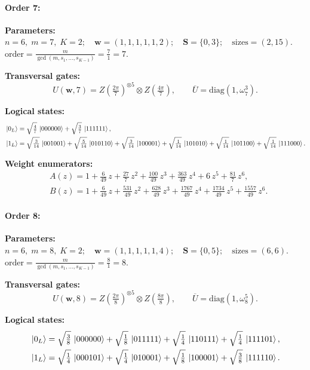 \documentclass[pdflatex,sn-nature]{sn-jnl}%
\theoremstyle{thmstyleone}%
\theoremstyle{thmstyletwo}%
\theoremstyle{thmstylethree}%
\begin{document}
\begin{appendices}
\paragraph{\textbf{Order 7:}}
\noindent\textbf{Parameters:} $n=6,\; m=7,\; K=2;\quad \mathbf w=(1, 1, 1, 1, 1, 2);\quad \mathbf S=\{0, 3\};\quad \text{sizes}=\left(2, 15\right).$ $\displaystyle \text{order}=\frac{m}{\gcd(m,s_1,\dots,s_{K-1})}=\frac{7}{1}=7.$

\noindent\textbf{Transversal gates:}
\[
    U(\mathbf w,7)=Z \left(\tfrac{2\pi}{7}\right)^{\otimes5} \otimes Z \left(\tfrac{4\pi}{7}\right) ,\qquad
    \overline U=\mathrm{diag}(1,\omega_{7}^{3}).
\]

\noindent\textbf{Logical states:}
\begin{align*}
    &\ket{0_L} = \sqrt{\tfrac{4}{7}}\,\ket{000000} + \sqrt{\tfrac{3}{7}}\,\ket{111111}, \\
    &\ket{1_L} = \sqrt{\tfrac{3}{14}}\,\ket{001001} + \sqrt{\tfrac{5}{14}}\,\ket{010110} + \sqrt{\tfrac{3}{14}}\,\ket{100001} + \sqrt{\tfrac{1}{14}}\,\ket{101010} + \sqrt{\tfrac{1}{14}}\,\ket{101100} + \sqrt{\tfrac{1}{14}}\,\ket{111000}.
\end{align*}

\noindent\textbf{Weight enumerators:}
\begin{align*}
    &A(z) = 1 + \tfrac{6}{49}\,z + \tfrac{27}{7}\,z^{2} + \tfrac{100}{49}\,z^{3} + \tfrac{363}{49}\,z^{4} + 6\,z^{5} + \tfrac{81}{7}\,z^{6}, \\
    &B(z) = 1 + \tfrac{6}{49}\,z + \tfrac{531}{49}\,z^{2} + \tfrac{628}{49}\,z^{3} + \tfrac{1767}{49}\,z^{4} + \tfrac{1734}{49}\,z^{5} + \tfrac{1557}{49}\,z^{6}.
\end{align*}

\paragraph{\textbf{Order 8:}}
\noindent\textbf{Parameters:} $n=6,\; m=8,\; K=2;\quad \mathbf w=(1, 1, 1, 1, 1, 4);\quad \mathbf S=\{0, 5\};\quad \text{sizes}=\left(6, 6\right).$ $\displaystyle \text{order}=\frac{m}{\gcd(m,s_1,\dots,s_{K-1})}=\frac{8}{1}=8.$

\noindent\textbf{Transversal gates:}
\[
    U(\mathbf w,8)=Z \left(\tfrac{2\pi}{8}\right)^{\otimes5} \otimes Z \left(\tfrac{8\pi}{8}\right) ,\qquad
    \overline U=\mathrm{diag}(1,\omega_{8}^{5}).
\]

\noindent\textbf{Logical states:}
\begin{align*}
    &\ket{0_L} = \sqrt{\tfrac{3}{8}}\,\ket{000000} + \sqrt{\tfrac{1}{8}}\,\ket{011111} + \sqrt{\tfrac{1}{4}}\,\ket{110111} + \sqrt{\tfrac{1}{4}}\,\ket{111101}, \\
    &\ket{1_L} = \sqrt{\tfrac{1}{4}}\,\ket{000101} + \sqrt{\tfrac{1}{4}}\,\ket{010001} + \sqrt{\tfrac{1}{8}}\,\ket{100001} + \sqrt{\tfrac{3}{8}}\,\ket{111110}.
\end{align*}


\end{appendices}
\end{document}
